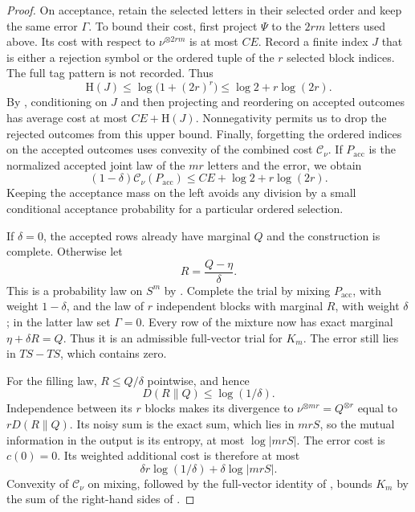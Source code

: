 \begin{proof}
On acceptance, retain the selected letters in their selected order and
keep the same error $\Gamma$.  To bound their cost, first project $\Psi$
to the $2rm$ letters used above.  Its cost with respect to
$\nu^{\otimes 2rm}$ is at most $CE$.  Record a finite index $J$ that is
either a rejection symbol or the ordered tuple of the $r$ selected block
indices.  The full tag pattern is not recorded.  Thus
\[
 \mathrm H(J)\le\log\bigl(1+(2r)^r\bigr)
                   \le\log2+r\log(2r).
\]
By , conditioning on $J$ and then
projecting and reordering on accepted outcomes has average cost at most
$CE+\mathrm H(J)$.  Nonnegativity permits us to drop the rejected outcomes
from this upper bound.  Finally, forgetting the ordered indices on the
accepted outcomes uses convexity of the combined cost
$\mathcal C_\nu$.  If $P_{\mathrm{acc}}$ is the normalized accepted joint
law of the $mr$ letters and the error, we obtain
\begin{equation}
\label{entropy-foundations:accepted-cost}
 (1-\delta)\mathcal C_\nu(P_{\mathrm{acc}})
       \le CE+\log2+r\log(2r).
\end{equation}
Keeping the acceptance mass on the left avoids any division by a small
conditional acceptance probability for a particular ordered selection.

If $\delta=0$, the accepted rows already have marginal $Q$ and the
construction is complete.  Otherwise let
\[
 R=\frac{Q-\eta}{\delta}.
\]
This is a probability law on $S^m$ by
.  Complete the trial by
mixing $P_{\mathrm{acc}}$, with weight $1-\delta$, and the law of $r$
independent blocks with marginal $R$, with weight $\delta$; in the latter
law set $\Gamma=0$.  Every row of the mixture now has exact marginal
$\eta+\delta R=Q$.  Thus it is an admissible full-vector trial for $K_m$.
The error still lies in $TS-TS$, which contains zero.

For the filling law, $R\le Q/\delta$ pointwise, and hence
\[
 D(R\|Q)\le\log(1/\delta).
\]
Independence between its $r$ blocks makes its divergence to
$\nu^{\otimes mr}=Q^{\otimes r}$ equal to $rD(R\|Q)$.  Its noisy sum is
the exact sum, which lies in $mrS$, so the mutual information in the
output is its entropy, at most $\log|mrS|$.  The error cost is $c(0)=0$.
Its weighted additional cost is therefore at most
\begin{equation}
\label{entropy-foundations:residual-cost}
 \delta r\log(1/\delta)+\delta\log|mrS|.
\end{equation}
Convexity of $\mathcal C_\nu$ on mixing, followed by the full-vector
identity of , bounds $K_m$ by the
sum of the right-hand sides of
.


\end{proof}
